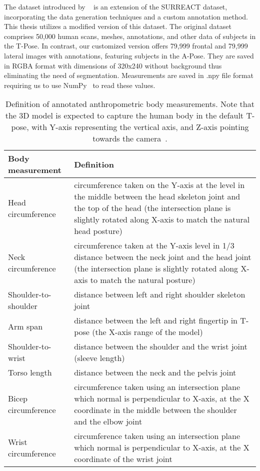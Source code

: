 The dataset introduced by ~\cite{super} is an extension of the SURREACT dataset, incorporating the data generation techniques and a custom annotation method. This thesis utilizes a modified version of this dataset. The original dataset comprises 50,000 human scans, meshes, annotations, and other data of subjects in the T-Pose. In contrast, our customized version offers 79,999 frontal and 79,999 lateral images with annotations, featuring subjects in the A-Pose.  They are saved in RGBA format with dimensions of 320x240 without background thus eliminating the need of segmentation. Measurements are saved in .npy file format requiring us to use NumPy~\cite{numpy} to read these values.

\begin{table}
	\caption[...]{Definition of annotated anthropometric body measurements. Note that the 3D model is expected to capture the human body in the default T-pose, with Y-axis representing the vertical axis, and Z-axis pointing towards the camera~\cite{super}.}
	\label{tab:cas}
	\begin{center}
		\footnotesize
		\begin{tabularx}{\textwidth}{lX}\hline
			Body measurement & Definition\\\hline
			Head circumference & circumference taken on the Y-axis at the level in the middle between the head skeleton joint and the top of the head (the intersection plane is slightly rotated along X-axis to match the natural head posture)\\
			Neck circumference & circumference taken at the Y-axis level in 1/3 distance between the neck joint and the head joint (the intersection plane is slightly rotated along X-axis to match the natural posture)\\
			Shoulder-to-shoulder & distance between left and right shoulder skeleton joint\\
			Arm span & distance between the left and right fingertip in T-pose (the X-axis range of the model)\\
			Shoulder-to-wrist & distance between the shoulder and the wrist joint (sleeve length)\\
			Torso length & distance between the neck and the pelvis joint\\
			Bicep circumference & circumference taken using an intersection plane which normal is perpendicular to X-axis, at the X coordinate in the middle between the shoulder and the elbow joint\\
			Wrist circumference & circumference taken using an intersection plane which normal is perpendicular to X-axis, at the X coordinate of the wrist joint\\

\end{tabularx}
\end{center}
\end{table}
